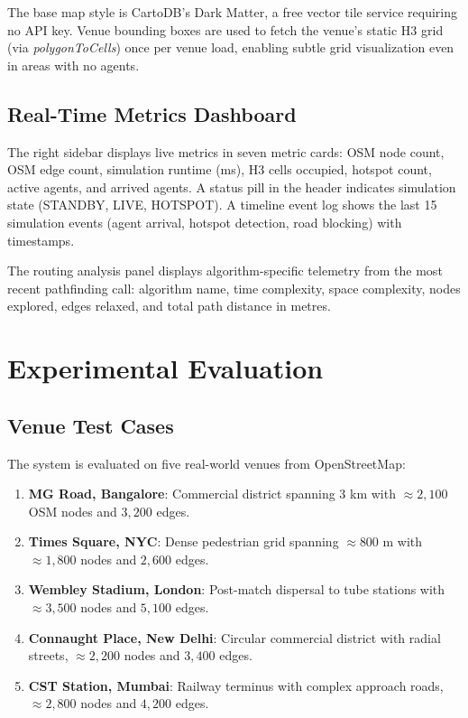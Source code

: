 \documentclass[conference]{IEEEtran}
\begin{document}
The base map style is CartoDB's Dark Matter, a free vector tile service requiring no API key. Venue bounding boxes are used to fetch the venue's static H3 grid (via \textit{polygonToCells}) once per venue load, enabling subtle grid visualization even in areas with no agents.

\subsection{Real-Time Metrics Dashboard}

The right sidebar displays live metrics in seven metric cards: OSM node count, OSM edge count, simulation runtime (ms), H3 cells occupied, hotspot count, active agents, and arrived agents. A status pill in the header indicates simulation state (STANDBY, LIVE, HOTSPOT). A timeline event log shows the last 15 simulation events (agent arrival, hotspot detection, road blocking) with timestamps.

The routing analysis panel displays algorithm-specific telemetry from the most recent pathfinding call: algorithm name, time complexity, space complexity, nodes explored, edges relaxed, and total path distance in metres.

\section{Experimental Evaluation}

\subsection{Venue Test Cases}

The system is evaluated on five real-world venues from OpenStreetMap:

\begin{enumerate}
\item \textbf{MG Road, Bangalore}: Commercial district spanning 3 km with $\approx 2,100$ OSM nodes and $3,200$ edges.
\item \textbf{Times Square, NYC}: Dense pedestrian grid spanning $\approx 800$ m with $\approx 1,800$ nodes and $2,600$ edges.
\item \textbf{Wembley Stadium, London}: Post-match dispersal to tube stations with $\approx 3,500$ nodes and $5,100$ edges.
\item \textbf{Connaught Place, New Delhi}: Circular commercial district with radial streets, $\approx 2,200$ nodes and $3,400$ edges.
\item \textbf{CST Station, Mumbai}: Railway terminus with complex approach roads, $\approx 2,800$ nodes and $4,200$ edges.
\end{enumerate}
\end{document}
